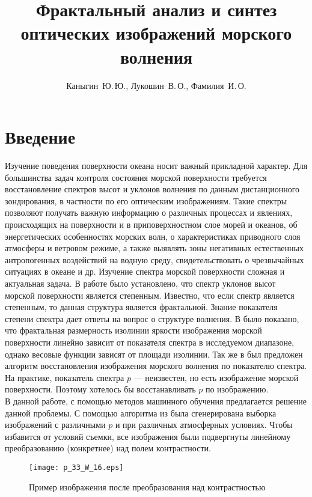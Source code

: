 \documentclass[12pt,twoside]{article}
\title
[Фрактальный анализ и синтез оптических изображений морского волнения] %
{Фрактальный анализ и синтез оптических изображений морского волнения}
\author
[Автор~И.\,О.] %
{Каныгин~Ю.\,Ю., Лукошин~В.\,О., Фамилия~И.\,О.} %
[Каныгин~Ю.\,Ю., Лукошин~В.\,О.$^2$, Фамилия~И.\,О.$^2$] %
\begin{document}
	\maketitle
	\section{Введение}
Изучение поведения поверхности океана носит важный прикладной характер. Для большинства задач контроля состояния морской поверхности требуется восстановление спектров высот и уклонов волнения по данным дистанционного зондирования, в частности по его оптическим изображениям. Такие спектры позволяют получать важную информацию о различных процессах и явлениях, происходящих на поверхности и в приповерхностном слое морей и океанов, об энергетических особенностях морских волн, о характеристиках приводного слоя атмосферы и ветровом режиме, а также выявлять зоны негативных естественных антропогенных воздействий на водную среду, свидетельствовать о чрезвычайных ситуациях в океане и др. Изучение спектра морской поверхности сложная и актуальная задача. В работе \cite{author09anyscience} было установлено, что спектр уклонов высот морской поверхности является степенным. Известно, что если спектр является степенным, то данная структура является фрактальной. Знание показателя степени спектра дает ответы на вопрос о структуре волнения. В \cite{author09anyscience} было показано, что фрактальная размерность изолинии яркости изображения морской поверхности линейно зависит от показателя спектра в исследуемом диапазоне, однако весовые функции зависят от площади изолинии. Так же в \cite{author09anyscience} был предложен алгоритм восстановления изображения морского волнения по показателю спектра. На практике, показатель спектра $p$ --- неизвестен, но есть изображение морской поверхности. Поэтому хотелось бы восстанавливать $p$ по изображению. \\
В данной работе, с помощью методов машинного обучения предлагается решение данной проблемы. С помощью алгоритма из \cite{author09anyscience} была сгенерирована выборка изображений с различными $p$  и при различных атмосферных условиях. Чтобы избавится от условий съемки, все изображения были подвергнуты линейному преобразованию (конкретнее) над полем контрастности. 
\begin{figure}[H]
    \centering
    \texttt{[image: p\_33\_W\_16.eps]}
    \caption{Пример изображения после преобразования над контрастностью}
\end{figure}
\end{document}
